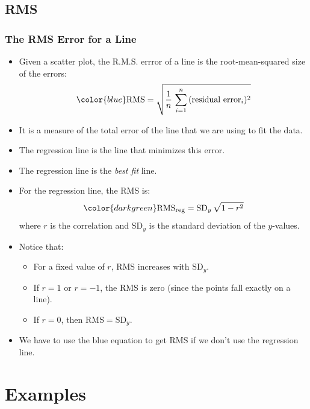 \documentclass[t]{beamer}
\begin{document}
\subsection{RMS}
\begin{frame}
\frametitle{The RMS Error for a Line}

\footnotesize
\begin{itemize}
\item Given a scatter plot, the {\color{blue}R.M.S. errror} of a line is 
the root-mean-squared size of the errors:\vspace{-5pt}
\[{\color{blue}\mbox{RMS} = \sqrt{\frac{1}{n}\,\sum_{i=1}^n\,(\mbox{residual error}_i)^2}}\vspace{-3pt}\]
\item It is a measure of the total error of the line that we are using  to fit the data.
\item The regression line is the line that minimizes this error.  
\item The regression line is the \textit{best fit} line.
\item For the regression line, the RMS is:\vspace{-3pt}
\[{\color{darkgreen}\mbox{RMS}_{\mbox{\footnotesize reg}} = \mbox{SD}_y\,\sqrt{1-r^2}}\vspace{-3pt}\]
where $r$ is the correlation and $\mbox{SD}_y$ is the standard deviation of the $y$-values.
\item Notice that:
  \begin{itemize}
\item \scriptsize For a fixed value of $r$, RMS increases with $\mbox{SD}_y$.
\item \scriptsize If $r=1$ or $r=-1$, the RMS is zero (since the points fall exactly on a line).
\item \scriptsize  If $r=0$, then $\mbox{RMS}=\mbox{SD}_y$.
\end{itemize}
\item We have to use the {\color{blue}blue} equation to get RMS if we don't use the regression line.
\end{itemize}

\end{frame}



\section{Examples}
\end{document}
